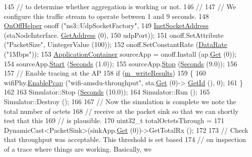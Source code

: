 \begin{DoxyCode}
145   \textcolor{comment}{// to determine whether aggregation is working or not.}
146   \textcolor{comment}{//}
147   \textcolor{comment}{// We configure this traffic stream to operate between 1 and 9 seconds.}
148   \hyperlink{classns3_1_1OnOffHelper}{OnOffHelper} onoff (\textcolor{stringliteral}{"ns3::UdpSocketFactory"},
149                      \hyperlink{classns3_1_1InetSocketAddress}{InetSocketAddress} (staNodeInterface.
      \hyperlink{classns3_1_1Ipv4InterfaceContainer_ae63208dcd222be986822937ee4aa828c}{GetAddress} (0),
150                                         udpPort));
151   onoff.SetAttribute (\textcolor{stringliteral}{"PacketSize"}, UintegerValue (100));
152   onoff.SetConstantRate (\hyperlink{classns3_1_1DataRate}{DataRate} (\textcolor{stringliteral}{"1Mbps"}));
153   \hyperlink{classns3_1_1ApplicationContainer}{ApplicationContainer} sourceApp = onoff.Install (ap.\hyperlink{classns3_1_1NodeContainer_a9ed96e2ecc22e0f5a3d4842eb9bf90bf}{Get} (0));
154   sourceApp.\hyperlink{classns3_1_1ApplicationContainer_a8eff87926507020bbe3e1390358a54a7}{Start} (\hyperlink{group__timecivil_ga33c34b816f8ff6628e33d5c8e9713b9e}{Seconds} (1.0));
155   sourceApp.\hyperlink{classns3_1_1ApplicationContainer_adfc52f9aa4020c8714679b00bbb9ddb3}{Stop} (\hyperlink{group__timecivil_ga33c34b816f8ff6628e33d5c8e9713b9e}{Seconds} (9.0));
156 
157   \textcolor{comment}{// Enable tracing at the AP}
158   \textcolor{keywordflow}{if} (\hyperlink{classWifiMsduAggregatorThroughputTest_a89cd7fa2be793060e380600808fff076}{m\_writeResults})
159     \{
160       wifiPhy.\hyperlink{classns3_1_1PcapHelperForDevice_a74866def9a881aa9d5c5be1225a26722}{EnablePcap} (\textcolor{stringliteral}{"wifi-amsdu-throughput"}, sta.\hyperlink{classns3_1_1NodeContainer_a9ed96e2ecc22e0f5a3d4842eb9bf90bf}{Get} (0)->
      \hyperlink{classns3_1_1Node_aaf49b64a843565ce3812326313b370ac}{GetId} (), 0);
161     \}
162 
163   Simulator::Stop (\hyperlink{group__timecivil_ga33c34b816f8ff6628e33d5c8e9713b9e}{Seconds} (10.0));
164   Simulator::Run ();
165   Simulator::Destroy ();
166 
167   \textcolor{comment}{// Now the simulation is complete we note the total number of octets}
168   \textcolor{comment}{// receive at the packet sink so that we can shortly test that this}
169   \textcolor{comment}{// is plausible.}
170   uint32\_t totalOctetsThrough =
171     DynamicCast<PacketSink>(sinkApp.\hyperlink{classns3_1_1ApplicationContainer_a9e565807abd4213a56566a7ccd8d7509}{Get} (0))->GetTotalRx ();
172 
173   \textcolor{comment}{// Check that throughput was acceptable. This threshold is set based}
174   \textcolor{comment}{// on inspection of a trace where things are working. Basically, we}

\end{DoxyCode}
